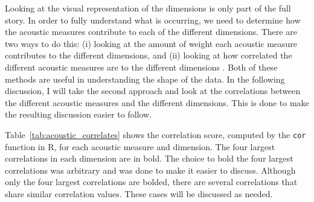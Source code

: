 Looking at the visual representation of the dimensions is only part of the full story. In order to fully understand what is occurring, we need to determine how the acoustic measures contribute to each of the different dimensions. There are two ways to do this: (i) looking at the amount of weight each acoustic measure contributes to the different dimensions, and (ii) looking at how correlated the different acoustic measures are to the different dimensions \citep{kruskalMultidimensionalScaling1978,hastieElementsStatisticalLearning2009}. Both of these methods are useful in understanding the shape of the data. In the following discussion, I will take the second approach and look at the correlations between the different acoustic measures and the different dimensions. This is done to make the resulting discussion easier to follow.   

Table~\ref{tab:acoustic_correlates} shows the correlation score, computed by the \texttt{cor} function in R, for each acoustic measure and dimension. The four largest correlations in each dimension are in bold. The choice to bold the four largest correlations was arbitrary and was done to make it easier to discuss. Although only the four largest correlations are bolded, there are several correlations that share similar correlation values. These cases will be discussed as needed.

